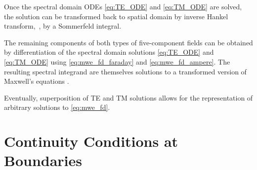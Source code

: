 Once the spectral domain \acp{ODE} \eqref{eq:TE_ODE} and \eqref{eq:TM_ODE}
are solved, the solution can be transformed back to spatial domain by
inverse Hankel transform,~\ie, by a Sommerfeld integral.

The remaining components of both types of five-component fields can be obtained
by differentiation of the spectral domain solutions \eqref{eq:TE_ODE} and
\eqref{eq:TM_ODE} using \eqref{eq:mwe_fd_faraday} and \eqref{eq:mwe_fd_ampere}.
The resulting spectral integrand are themselves solutions to a transformed
version of Maxwell's equations \cite[p75]{Chew1999}.

Eventually, superposition of \ac{TE} and \ac{TM} solutions allows for the
representation of arbitrary solutions to \eqref{eq:mwe_fd}.











\section{Continuity Conditions at Boundaries}
\label{sec:continuity_at_interfaces}

